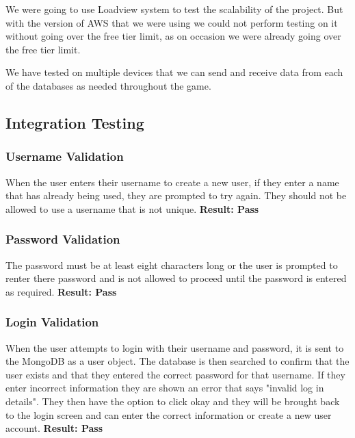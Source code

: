 We were going to use Loadview system to test the scalability of the project. But with the version of AWS that we were using we could not perform testing on it without going over the free tier limit, as on occasion we were already going over the free tier limit. \newline 

We have tested on multiple devices that we can send and receive data from each of the databases as needed throughout the game. \newline

\subsection{Integration Testing } \newline

\subsubsection{Username Validation} \newline
When the user enters their username to create a new user, if they enter a name that has already being used, they are prompted to try again. They should not be allowed to use a username that is not unique.  \newline
\textbf{Result: Pass} 

\subsubsection{Password Validation}  \newline
The password must be at least eight characters long or the user is prompted to renter there password and is not allowed to proceed until the password is entered as required.\newline
\textbf{Result: Pass}

\subsubsection{Login Validation}  \newline
When the user attempts to login with their username and password, it is sent to the MongoDB as a user object. The database is then searched to confirm that the user exists and that they entered the correct password for that username. If they enter incorrect information they are shown an error that says "invalid log in details". They then have the option to click okay and they will be brought back to the login screen and can enter the correct information or create a new user account.\newline 
\textbf{Result: Pass}

